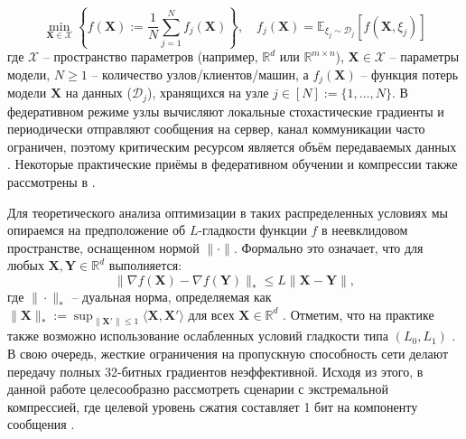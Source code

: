 \documentclass{article}
\begin{document}

\begin{equation}
\min_{\mathbf{X} \in \mathcal{X}} \left\{ f(\mathbf{X}) := \frac{1}{N}\sum_{j=1}^N f_j(\mathbf{X})\right\}, \quad f_j(\mathbf{X})=\mathbb{E}_{\xi_j\sim \mathcal{D}_j}[f(\mathbf{X},\xi_j)]
\label{fed_eq}
\end{equation}
где $\mathcal{X}$ -- пространство параметров (например, $\mathbb{R}^d$ или $\mathbb{R}^{m \times n}$), $\mathbf{X} \in \mathcal{X}$ -- параметры модели, $N \ge 1$ -- количество узлов/клиентов/машин, а $f_j(\mathbf{X})$ -- функция потерь модели $\mathbf{X}$ на данных ($\mathcal{D}_j$), хранящихся на узле $j \in [N] := \{1, \dots, N\}$. В федеративном режиме узлы вычисляют локальные стохастические градиенты и периодически отправляют сообщения на сервер, канал коммуникации часто ограничен, поэтому критическим ресурсом является объём передаваемых данных \cite{bernstein2019signsgdmajority, horvath2023stochastic}. Некоторые практические приёмы в федеративном обучении и компрессии также рассмотрены в \cite{beznosikov2020biased, gruntkowska2025error, ahn2025dion}.

Для теоретического анализа оптимизации в таких распределенных условиях мы опираемся на предположение об $L$-гладкости функции $f$ в неевклидовом пространстве, оснащенном нормой $\|\cdot\|$. Формально это означает, что для любых $\mathbf{X}, \mathbf{Y} \in \mathbb{R}^d$ выполняется:
\begin{equation}
\|\nabla f(\mathbf{X}) - \nabla f(\mathbf{Y})\|_* \leq L \|\mathbf{X} - \mathbf{Y}\|,
\end{equation}
где $\|\cdot\|_*$ -- дуальная норма, определяемая как $\|\mathbf{X}\|_* := \sup_{\|\mathbf{X}'\| \leq 1} \langle \mathbf{X}, \mathbf{X}' \rangle \text{ для всех } \mathbf{X} \in \mathbb{R}^d$ \cite{kovalev2025understanding}. Отметим, что на практике также возможно использование ослабленных условий гладкости типа $(L_0,L_1)$ \cite{pethick2025generalized}. В свою очередь, жесткие ограничения на пропускную способность сети делают передачу полных 32-битных градиентов неэффективной. Исходя из этого, в данной работе целесообразно рассмотреть сценарии с экстремальной компрессией, где целевой уровень сжатия составляет 1 бит на компоненту сообщения \cite{bernstein2018signsgd, bernstein2019signsgdmajority, beznosikov2020biased}.
\end{document}
